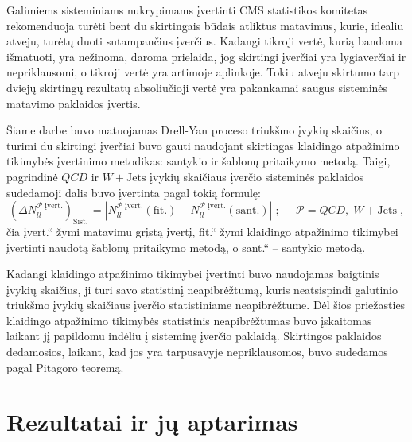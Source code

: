 \documentclass[a4paper, 12pt, oneside]{article}
\newcommand{\WJets}{W\! +\!\mathrm{Jets}}
\newcommand{\ltq}[1]{{\quotedblbase{}#1\textquotedblleft{}}}
\newcommand{\QCD}{QC\! D}
\newlength\q
\begin{document}
Galimiems sisteminiams nukrypimams įvertinti CMS statistikos komitetas rekomenduoja turėti bent du skirtingais būdais
atliktus matavimus, kurie, idealiu atveju, turėtų duoti sutampančius įverčius.
Kadangi tikroji vertė, kurią bandoma išmatuoti, yra nežinoma, daroma prielaida, jog skirtingi įverčiai yra
lygiaverčiai ir nepriklausomi, o tikroji vertė yra artimoje aplinkoje.
Tokiu atveju skirtumo tarp dviejų skirtingų rezultatų absoliučioji vertė yra pakankamai saugus sisteminės matavimo
paklaidos įvertis.

Šiame darbe buvo matuojamas Drell-Yan proceso triukšmo įvykių skaičius, o turimi du skirtingi įverčiai buvo gauti naudojant
skirtingas klaidingo atpažinimo tikimybės įvertinimo metodikas: santykio ir šablonų pritaikymo metodą.
Taigi, pagrindinė $\QCD$ ir $\WJets$ įvykių skaičiaus įverčio sisteminės paklaidos sudedamoji dalis buvo įvertinta pagal
tokią formulę:
\begin{equation}
	(\Delta N_{ll}^{\mathcal{P} \; \mathrm{įvert.}})_{\mathrm{Sist.\,}} =
	\left| N_{ll}^{\mathcal{P} \; \mathrm{įvert.}}(\mathrm{fit.}) -
	N_{ll}^{\mathcal{P} \; \mathrm{įvert.}}(\mathrm{sant.}) \right| \;  ;
	\;\;\;\;\; \mathcal{P} = \QCD, \; \WJets \; ,
	\label{eq:systUncFR}
\end{equation}
čia \ltq{įvert.} žymi matavimu grįstą įvertį, \ltq{fit.} žymi klaidingo atpažinimo tikimybei įvertinti naudotą šablonų
pritaikymo metodą, o \ltq{sant.} -- santykio metodą.

Kadangi klaidingo atpažinimo tikimybei įvertinti buvo naudojamas baigtinis įvykių skaičius, ji turi savo statistinį neapibrėžtumą,
kuris neatsispindi galutinio triukšmo įvykių skaičiaus įverčio statistiniame neapibrėžtume.
Dėl šios priežasties klaidingo atpažinimo tikimybės statistinis neapibrėžtumas buvo įskaitomas laikant jį papildomu indėliu į
sisteminę įverčio paklaidą.
Skirtingos paklaidos dedamosios, laikant, kad jos yra tarpusavyje nepriklausomos, buvo sudedamos pagal Pitagoro teoremą.

\section{Rezultatai ir jų aptarimas}
\end{document}
